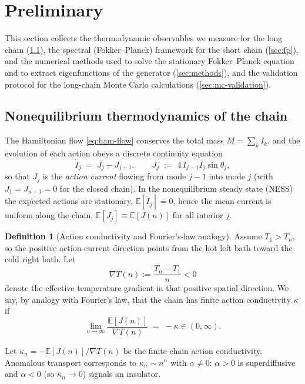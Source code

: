 \documentclass[11pt,a4paper]{article}
\theoremstyle{definition}
\newtheorem{definition}[theorem]{Definition}
\newcommand{\E}{\mathbb{E}}
\numberwithin{equation}{section}   %
\begin{document}
\section{Preliminary}

This section collects the thermodynamic observables we measure for the long
chain (\cref{sec:thermo}), the spectral (Fokker--Planck) framework for the
short chain (\cref{sec:fp}), and the numerical methods used to solve the
stationary Fokker--Planck equation and to extract eigenfunctions of the
generator (\cref{sec:methods}), and the validation protocol for the long-chain
Monte Carlo calculations (\cref{sec:mc-validation}).

\subsection{Nonequilibrium thermodynamics of the chain}\label{sec:thermo}

The Hamiltonian flow \eqref{eq:ham-flow} conserves the total mass
$M=\sum_k I_k$, and the evolution of each action obeys a discrete continuity
equation
\begin{equation}\label{eq:continuity}
  \dot I_j \;=\; J_j - J_{j+1},
  \qquad
  J_j \;:=\; 4\, I_{j-1} I_j \sin\theta_j ,
\end{equation}
so that $J_j$ is the \emph{action current} flowing from mode $j-1$ into mode
$j$ (with $J_1=J_{n+1}=0$ for the closed chain). In the nonequilibrium steady
state (NESS) the expected actions are stationary, $\E[\dot I_j]=0$, hence the
mean current is uniform along the chain, $\E[J_j]\equiv \E[J(n)]$ for all interior
$j$.

\begin{definition}[Action conductivity and Fourier's-law analogy]\label{de:fourier}
Assume $T_1>T_n$, so the positive action-current direction points from the hot
left bath toward the cold right bath. Let
\[
  \nabla T(n):=\frac{T_n-T_1}{n}<0
\]
denote the effective temperature gradient in that positive spatial direction.
We say, by analogy with Fourier's law, that the chain has finite action
conductivity $\kappa$ if
\begin{equation}\label{eq:fourier}
  \lim_{n \rightarrow \infty}\frac{\E[J(n)]}{\nabla T(n)} \;=\; -
  \kappa \in (0,\infty).
\end{equation}

Let $\kappa_n=-\E[J(n)]/\nabla T(n)$ be the finite-chain action
conductivity. Anomalous transport corresponds to $\kappa_n\sim n^{\alpha}$
with $\alpha\neq0$:
$\alpha>0$ is superdiffusive and $\alpha<0$ (so $\kappa_n\to0$) signals an
insulator.
\end{definition}
\end{document}
